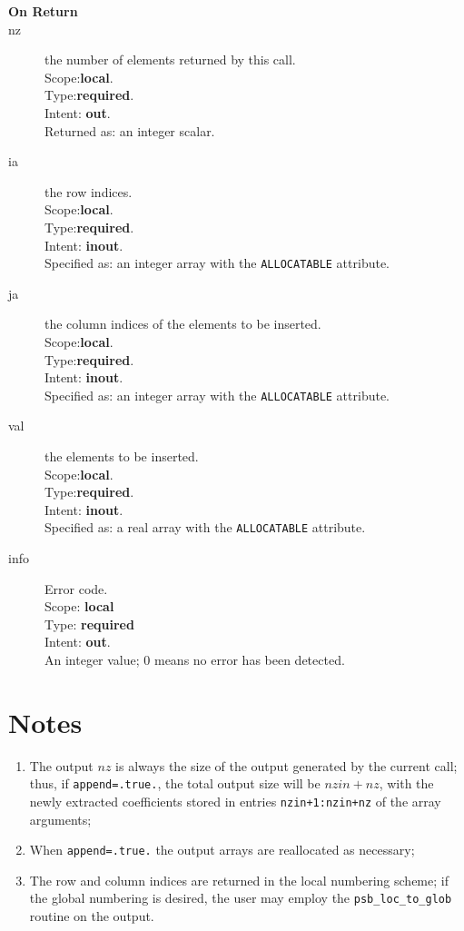 \begin{description}
\item[\bf On Return]
\item[nz] the number of elements returned by this call.\\
Scope:{\bf local}.\\
Type:{\bf required}.\\
Intent: {\bf out}.\\
Returned  as: an integer scalar.
\item[ia] the row indices.\\
Scope:{\bf local}.\\
Type:{\bf required}.\\
Intent: {\bf inout}.\\
Specified as: an integer array with the \verb|ALLOCATABLE| attribute.
\item[ja] the column indices of the elements to be inserted.\\
Scope:{\bf local}.\\
Type:{\bf required}.\\
Intent: {\bf inout}.\\
Specified as: an integer array with the \verb|ALLOCATABLE| attribute.
\item[val] the elements to be inserted.\\
Scope:{\bf local}.\\
Type:{\bf required}.\\
Intent: {\bf inout}.\\
Specified as: a real  array with the \verb|ALLOCATABLE| attribute.
\item[info] Error code.\\
Scope: {\bf local} \\
Type: {\bf required} \\
Intent: {\bf out}.\\
An integer value; 0 means no error has been detected. 
\end{description}

\section*{Notes}
\begin{enumerate}
\item The output $nz$ is always the size of the output generated by
  the current call; thus, if \verb|append=.true.|, the total output
  size will be $nzin+nz$, with the newly extracted coefficients stored in
  entries \verb|nzin+1:nzin+nz| of the array arguments;
\item When \verb|append=.true.|  the output arrays are reallocated as
  necessary;
\item The row and column indices are returned in the local numbering
  scheme; if the global numbering is desired, the user may employ the
  \verb|psb_loc_to_glob| routine on the output.
\end{enumerate}




